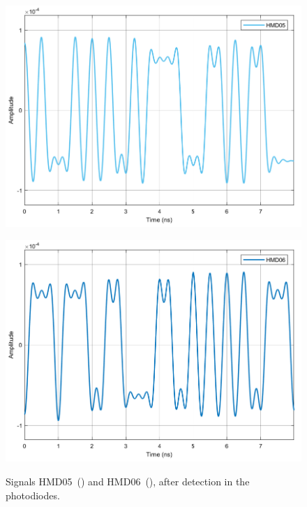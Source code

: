 \begin{figure}[H]
	\centering
	\begin{minipage}{0.45\textwidth}
		\centering
		\includegraphics[width=1\textwidth]		
		{./sdf/m_qam_system/figures/simulations/03_eNoise/HMD05.pdf}
		\subcaption{}\label{fig:sim_eNoiseHmd05}
	\end{minipage}
	\begin{minipage}{0.45\textwidth}
		\centering
		\includegraphics[width=1\textwidth]
		{sdf/m_qam_system/figures/simulations/03_eNoise/HMD06.pdf}
		\subcaption{}\label{fig:sim_eNoiseHmd06}
	\end{minipage}
	\caption{Signals HMD05~() and 
		HMD06~(), after detection in the 
		photodiodes.}\label{fig:sim_eNoiseHmd0506}
\end{figure}


